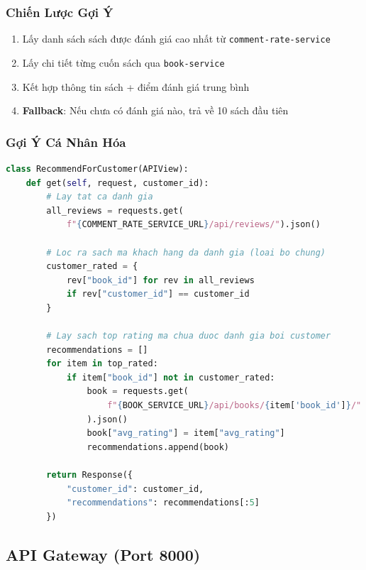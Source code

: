 \documentclass[12pt,a4paper]{article}
\begin{document}
\subsubsection{Chiến Lược Gợi Ý}

\begin{enumerate}[leftmargin=1.5cm]
  \item Lấy danh sách sách được đánh giá cao nhất từ \texttt{comment-rate-service}
  \item Lấy chi tiết từng cuốn sách qua \texttt{book-service}
  \item Kết hợp thông tin sách + điểm đánh giá trung bình
  \item \textbf{Fallback}: Nếu chưa có đánh giá nào, trả về 10 sách đầu tiên
\end{enumerate}

\subsubsection{Gợi Ý Cá Nhân Hóa}

\begin{lstlisting}[language=Python, caption={Gợi ý sách cá nhân hóa theo customer\_id}]
class RecommendForCustomer(APIView):
    def get(self, request, customer_id):
        # Lay tat ca danh gia
        all_reviews = requests.get(
            f"{COMMENT_RATE_SERVICE_URL}/api/reviews/").json()

        # Loc ra sach ma khach hang da danh gia (loai bo chung)
        customer_rated = {
            rev["book_id"] for rev in all_reviews
            if rev["customer_id"] == customer_id
        }

        # Lay sach top rating ma chua duoc danh gia boi customer
        recommendations = []
        for item in top_rated:
            if item["book_id"] not in customer_rated:
                book = requests.get(
                    f"{BOOK_SERVICE_URL}/api/books/{item['book_id']}/"
                ).json()
                book["avg_rating"] = item["avg_rating"]
                recommendations.append(book)

        return Response({
            "customer_id": customer_id,
            "recommendations": recommendations[:5]
        })
\end{lstlisting}

\subsection{API Gateway (Port 8000)}
\end{document}
